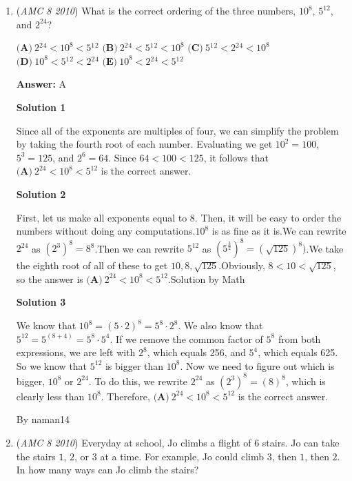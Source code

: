 \begin{enumerate}
 


	\item (\textit{AMC 8 2010}) What is the correct ordering of the three numbers, $10^8$, $5^{12}$, and $2^{24}$?


 $\textbf{(A)}\ 2{}^2{}^4<10^8<5{}^1{}^2$
$\textbf{(B)}\ 2{}^2{}^4<5{}^1{}^2<10^8$
$\textbf{(C)}\ 5{}^1{}^2<2{}^2{}^4<10^8$
$\textbf{(D)}\ 10^8<5{}^1{}^2<2{}^2{}^4$
$\textbf{(E)}\ 10^8<2{}^2{}^4<5{}^1{}^2$

 \textbf{Answer: }A



\textbf{Solution 1}

Since all of the exponents are multiples of four, we can simplify the problem by taking the fourth root of each number. Evaluating we get $10^2=100$, $5^3=125$, and $2^6=64$. Since $64<100<125$, it follows that $\boxed{\textbf{(A)}\ 2^{24}<10^8<5^{12}}$ is the correct answer.

 



\textbf{Solution 2}

First, let us make all exponents equal to 8. Then, it will be easy to order the numbers without doing any computations.$10^8$ is as fine as it is.We can rewrite $2^{24}$ as $(2^3)^8=8^8$.Then we can rewrite $5^{12}$ as $(5^{\frac{3}{2}})^8=(\sqrt{125})^8)$.We take the eighth root of all of these to get ${10, 8, \sqrt{125}}$.Obviously, $8<10<\sqrt{125}$, so the answer is $\boxed{\textbf{(A)}\ 2^{24}<10^8<5^{12}}$.Solution by Math

 



\textbf{Solution 3}

We know that $10^{8}=({5}\cdot{2})^{8}=5^{8}\cdot2^{8}$. We also know that $5^{12}=5^{(8+4)}=5^{8}\cdot5^{4}$. If we remove the common factor of $5^{8}$ from both expressions, we are left with $2^{8}$, which equals 256, and $5^{4}$, which equals 625. So we know that $5^{12}$ is bigger than $10^{8}$. Now we need to figure out which is bigger, $10^{8}$ or $2^{24}$. To do this, we rewrite $2^{24}$ as $(2^{3})^{8}=(8)^{8}$, which is clearly less than $10^{8}$. Therefore, $\boxed{\textbf{(A)}\ 2^{24}<10^8<5^{12}}$ is the correct answer.

 By naman14

 


 


	\item (\textit{AMC 8 2010}) Everyday at school, Jo climbs a flight of $6$ stairs. Jo can take the stairs $1$, $2$, or $3$ at a time. For example, Jo could climb $3$, then $1$, then $2$. In how many ways can Jo climb the stairs?



\end{enumerate}
